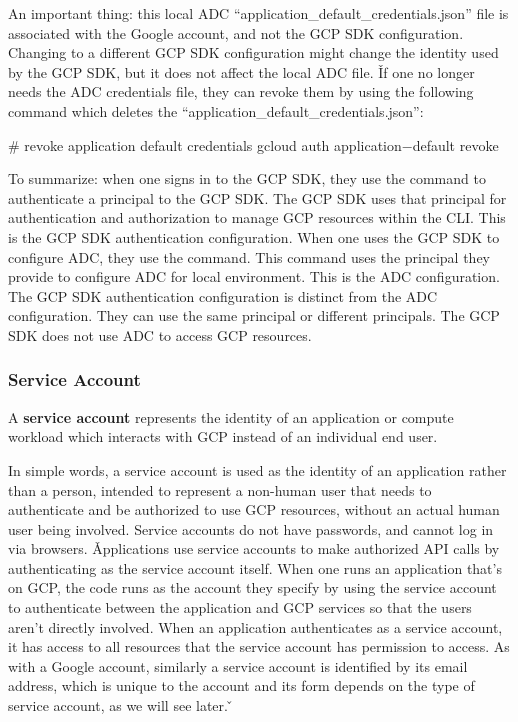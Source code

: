 An important thing: this local ADC ``application\_default\_credentials.json'' file is associated with the Google
account, and not the GCP SDK configuration. Changing to a different GCP SDK configuration might change the identity
used by the GCP SDK, but it does not affect the local ADC file. \v

If one no longer needs the ADC credentials file, they can revoke them by using the following command which deletes the
``application\_default\_credentials.json'':
\begin{bash}
# revoke application default credentials
gcloud auth application$-$default revoke
\end{bash}

To summarize: when one signs in to the GCP SDK, they use the  command to authenticate a
principal to the GCP SDK. The GCP SDK uses that principal for authentication and authorization to manage GCP
resources within the CLI. This is the GCP SDK authentication configuration. When one uses the GCP SDK to configure
ADC, they use the  command. This command uses the principal they provide
to configure ADC for local environment. This is the ADC configuration. The GCP SDK authentication configuration is
distinct from the ADC configuration. They can use the same principal or different principals. The GCP SDK does not
use ADC to access GCP resources.


\subsubsection{Service Account}

A \textbf{service account} represents the identity of an application or compute workload which interacts with GCP
instead of an individual end user.
\ed

In simple words, a service account is used as the identity of an application rather than a person, intended to represent
a non-human user that needs to authenticate and be authorized to use GCP resources, without an actual human user being
involved. Service accounts do not have passwords, and cannot log in via browsers. \v

Applications use service accounts to make authorized API calls by authenticating as the service account itself. When
one runs an application that's on GCP, the code runs as the account they specify by using the service account to
authenticate between the application and GCP services so that the users aren't directly involved. When an application
authenticates as a service account, it has access to all resources that the service account has permission to access.
As with a Google account, similarly a service account is identified by its email address, which is unique to the account
and its form depends on the type of service account, as we will see later. \v

